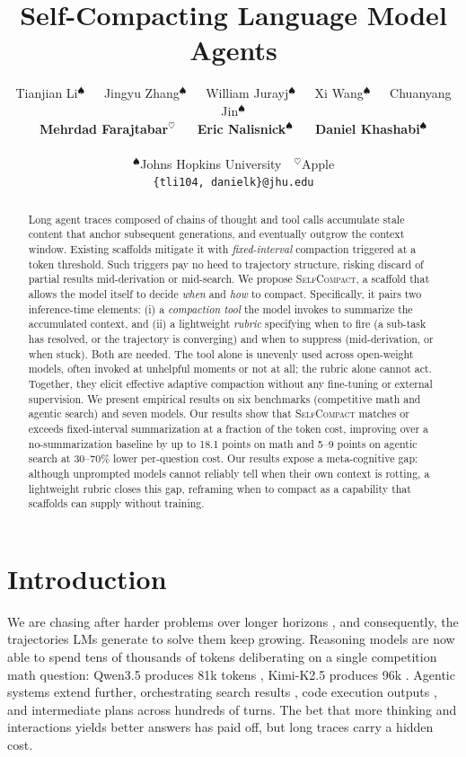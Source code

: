 \documentclass{article}
\title{Self-Compacting Language Model Agents}
\author{%
  Tianjian Li$^{\spadesuit}$~~~Jingyu Zhang$^{\spadesuit}$~~~William Jurayj$^{\spadesuit}$~~~Xi Wang$^{\spadesuit}$~~~Chuanyang Jin$^{\spadesuit}$ \\
  \textbf{Mehrdad Farajtabar$^{\heartsuit}$~~~Eric Nalisnick$^{\spadesuit}$~~~Daniel Khashabi$^{\spadesuit}$} \\
  \\
  $^{\spadesuit}$Johns Hopkins University~~$^{\heartsuit}$Apple \\
  \texttt{\{tli104, danielk\}@jhu.edu} \\
}
\newcommand{\method}{\textsc{{SelfCompact}}}
\begin{document}
\maketitle


\begin{abstract}
Long agent traces composed of chains of thought and tool calls accumulate stale content that anchor subsequent generations, and eventually outgrow the context window. Existing scaffolds mitigate it with
\textit{fixed-interval} compaction triggered at a token threshold. Such triggers pay no heed to trajectory structure, risking
discard of partial results mid-derivation or mid-search. We propose
\method{}, a scaffold that allows the model itself to decide \textit{when} and \textit{how} to compact. Specifically, it
pairs two inference-time elements: 
(i) a
\emph{compaction tool} the model invokes to summarize the accumulated context, and  
(ii) a lightweight
\emph{rubric} specifying when to fire (a sub-task has resolved, or
the trajectory is converging) and when to suppress (mid-derivation,
or when stuck). Both are needed. The tool alone is unevenly used
across open-weight models, often invoked at unhelpful moments or not
at all; the rubric alone cannot act. Together, they elicit effective
adaptive compaction without any fine-tuning or external supervision. We present empirical results on six benchmarks (competitive math
and agentic search) and seven models. Our results show that
\method{} matches or exceeds fixed-interval summarization at a fraction of the token cost, improving over a no-summarization baseline by up to 18.1 points on math and 5--9 points on agentic search at 30--70\% lower
per-question cost. Our results expose a meta-cognitive gap: although unprompted models cannot reliably tell when their own context is rotting, a lightweight rubric closes this gap, reframing when to compact as a capability that scaffolds can supply without training.

\end{abstract}

\section{Introduction}
\label{sec:intro}

We are chasing after harder problems over longer horizons \citep{metr-2026-time-horizon-1-1}, and consequently, the trajectories LMs generate to solve them keep growing. Reasoning models are now able to spend tens of thousands of tokens deliberating on a single competition math question: Qwen3.5 produces 81k tokens \citep{qwen3.5}, Kimi-K2.5 produces 96k \citep{kimiteam2026kimik25visualagentic}. Agentic systems extend further, orchestrating search results \citep{wei2025browsecompsimplechallengingbenchmark}, code execution outputs \citep{jimenez2024swebench}, and intermediate plans \citep{novikov2025alphaevolvecodingagentscientific} across hundreds of turns. The bet that more thinking and interactions yields better answers has paid off, but long traces carry a hidden cost.
\end{document}
